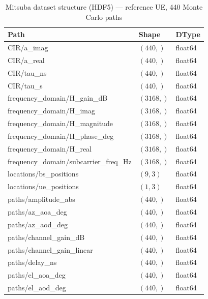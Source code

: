 \begin{table}[htbp]
\caption{Mitsuba dataset structure (HDF5) --- reference UE, 440 Monte Carlo paths}
\label{tab:mitsuba_dataset}
\centering
\begin{tabular}{lll}
\toprule
Path & Shape & DType \\
\midrule
CIR/a\_imag                          & $(440,)$   & float64 \\
CIR/a\_real                          & $(440,)$   & float64 \\
CIR/tau\_ns                          & $(440,)$   & float64 \\
CIR/tau\_s                           & $(440,)$   & float64 \\
frequency\_domain/H\_gain\_dB        & $(3168,)$  & float64 \\
frequency\_domain/H\_imag            & $(3168,)$  & float64 \\
frequency\_domain/H\_magnitude       & $(3168,)$  & float64 \\
frequency\_domain/H\_phase\_deg      & $(3168,)$  & float64 \\
frequency\_domain/H\_real            & $(3168,)$  & float64 \\
frequency\_domain/subcarrier\_freq\_Hz & $(3168,)$ & float64 \\
locations/bs\_positions              & $(9, 3)$   & float64 \\
locations/ue\_positions              & $(1, 3)$   & float64 \\
paths/amplitude\_abs                 & $(440,)$   & float64 \\
paths/az\_aoa\_deg                   & $(440,)$   & float64 \\
paths/az\_aod\_deg                   & $(440,)$   & float64 \\
paths/channel\_gain\_dB              & $(440,)$   & float64 \\
paths/channel\_gain\_linear          & $(440,)$   & float64 \\
paths/delay\_ns                      & $(440,)$   & float64 \\
paths/el\_aoa\_deg                   & $(440,)$   & float64 \\
paths/el\_aod\_deg                   & $(440,)$   & float64 \\
\bottomrule
\end{tabular}
\end{table}
